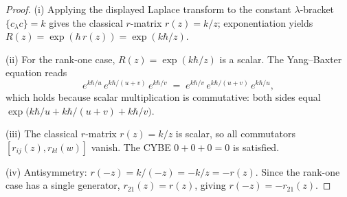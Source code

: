\begin{proof}
(i) Applying the displayed Laplace transform to the constant
$\lambda$-bracket $\{c {}_\lambda c\}=k$ gives the classical
$r$-matrix $r(z)=k/z$; exponentiation yields
$R(z) = \exp(\hbar\, r(z)) = \exp(k\hbar/z)$.

(ii) For the rank-one case, $R(z) = \exp(k\hbar/z)$
is a scalar. The Yang--Baxter equation reads
\[
e^{k\hbar/u}\,e^{k\hbar/(u+v)}\,e^{k\hbar/v}
\;=\;
e^{k\hbar/v}\,e^{k\hbar/(u+v)}\,e^{k\hbar/u},
\]
which holds because scalar multiplication is commutative: both
sides equal $\exp\bigl(k\hbar/u + k\hbar/(u+v) + k\hbar/v\bigr)$.

(iii) The classical $r$-matrix $r(z) = k/z$ is scalar, so all
commutators $[r_{ij}(z), r_{kl}(w)]$ vanish. The CYBE
$0 + 0 + 0 = 0$ is satisfied.

(iv) Antisymmetry: $r(-z) = k/(-z) = -k/z = -r(z)$. Since the
rank-one case has a single generator, $r_{21}(z) = r(z)$, giving
$r(-z) = -r_{21}(z)$.
\end{proof}

